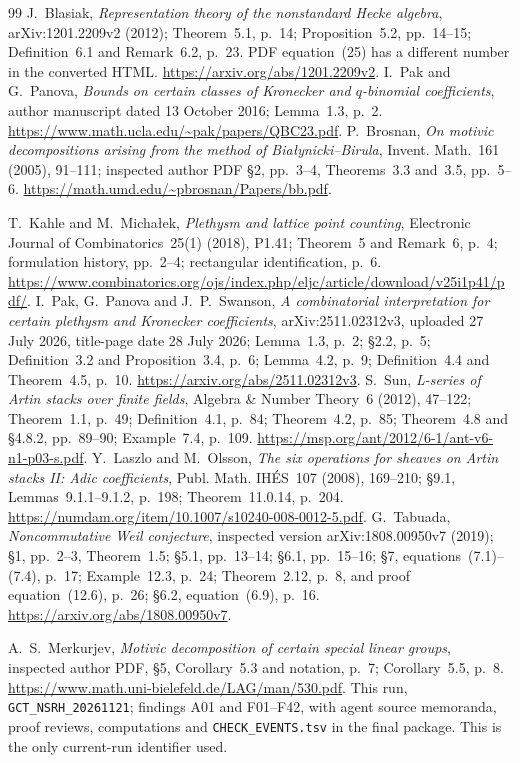 \begin{thebibliography}{99}
 J.~Blasiak, \emph{Representation theory of the nonstandard Hecke algebra}, arXiv:1201.2209v2 (2012); Theorem~5.1, p.~14; Proposition~5.2, pp.~14--15; Definition~6.1 and Remark~6.2, p.~23. PDF equation~(25) has a different number in the converted HTML. \url{https://arxiv.org/abs/1201.2209v2}.
 I.~Pak and G.~Panova, \emph{Bounds on certain classes of Kronecker and $q$-binomial coefficients}, author manuscript dated 13 October 2016; Lemma~1.3, p.~2. \url{https://www.math.ucla.edu/~pak/papers/QBC23.pdf}.
 P.~Brosnan, \emph{On motivic decompositions arising from the method of Bia\l ynicki--Birula}, Invent. Math.~161 (2005), 91--111; inspected author PDF \S2, pp.~3--4, Theorems~3.3 and~3.5, pp.~5--6. \url{https://math.umd.edu/~pbrosnan/Papers/bb.pdf}.


 T.~Kahle and M.~Micha{\l}ek, \emph{Plethysm and lattice point counting}, Electronic Journal of Combinatorics~25(1) (2018), P1.41; Theorem~5 and Remark~6, p.~4; formulation history, pp.~2--4; rectangular identification, p.~6. \url{https://www.combinatorics.org/ojs/index.php/eljc/article/download/v25i1p41/pdf/}.
 I.~Pak, G.~Panova and J.~P.~Swanson, \emph{A combinatorial interpretation for certain plethysm and Kronecker coefficients}, arXiv:2511.02312v3, uploaded 27 July 2026, title-page date 28 July 2026; Lemma~1.3, p.~2; \S2.2, p.~5; Definition~3.2 and Proposition~3.4, p.~6; Lemma~4.2, p.~9; Definition~4.4 and Theorem~4.5, p.~10. \url{https://arxiv.org/abs/2511.02312v3}.
 S.~Sun, \emph{L-series of Artin stacks over finite fields}, Algebra \& Number Theory~6 (2012), 47--122; Theorem~1.1, p.~49; Definition~4.1, p.~84; Theorem~4.2, p.~85; Theorem~4.8 and \S4.8.2, pp.~89--90; Example~7.4, p.~109. \url{https://msp.org/ant/2012/6-1/ant-v6-n1-p03-s.pdf}.
 Y.~Laszlo and M.~Olsson, \emph{The six operations for sheaves on Artin stacks II: Adic coefficients}, Publ. Math. IH\'ES~107 (2008), 169--210; \S9.1, Lemmas~9.1.1--9.1.2, p.~198; Theorem~11.0.14, p.~204. \url{https://numdam.org/item/10.1007/s10240-008-0012-5.pdf}.
 G.~Tabuada, \emph{Noncommutative Weil conjecture}, inspected version arXiv:1808.00950v7 (2019); \S1, pp.~2--3, Theorem~1.5; \S5.1, pp.~13--14; \S6.1, pp.~15--16; \S7, equations~(7.1)--(7.4), p.~17; Example~12.3, p.~24; Theorem~2.12, p.~8, and proof equation~(12.6), p.~26; \S6.2, equation~(6.9), p.~16. \url{https://arxiv.org/abs/1808.00950v7}.

 A.~S.~Merkurjev, \emph{Motivic decomposition of certain special linear groups}, inspected author PDF, \S5, Corollary~5.3 and notation, p.~7; Corollary~5.5, p.~8. \url{https://www.math.uni-bielefeld.de/LAG/man/530.pdf}.
 This run, \texttt{GCT\_NSRH\_20261121}; findings A01 and F01--F42, with agent source memoranda, proof reviews, computations and \texttt{CHECK\_EVENTS.tsv} in the final package. This is the only current-run identifier used.
\end{thebibliography}

